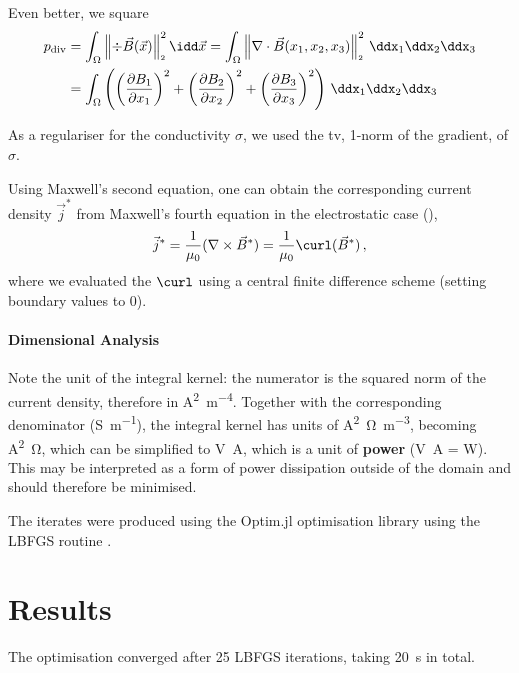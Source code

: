 \documentclass[10pt]{article}
\renewcommand{\norm}[1]{\left\lVert#1\right\rVert_{\scriptscriptstyle 2}}
\begin{document}
  Even better, we square
  \begin{align*}
    p_{\rm div} & = \int_\Omega \norm{\div \vec{B}(\vec{x})}^2 \idd\vec{x} = \int_{\Omega} \norm{\nabla \cdot \vec{B}(x_1, x_2, x_3)}^2 \,\ddx_1\ddx_2\ddx_3                                                             \\
                & = \int_\Omega \left(\left(\frac{\partial B_1}{\partial x_1}\right)^2 + \left(\frac{\partial B_2}{\partial x_2}\right)^2 + \left(\frac{\partial B_3}{\partial x_3}\right)^2\right) \,\ddx_1\ddx_2\ddx_3
  \end{align*}

  As a regulariser for the conductivity $\sigma$, we used the \gls{tv}, 1-norm of the gradient, of $\sigma$.

  Using Maxwell's second equation, one can obtain the corresponding current density $\vec{j}^*$ from Maxwell's fourth equation in the electrostatic case (),
  $$\vec{j}^* = \frac{1}{\mu_0} (\nabla \times \vec{B}^*) = \frac{1}{\mu_0} \curl(\vec{B}^*)\,,$$
  where we evaluated the $\curl$ using a central finite difference scheme (setting boundary values to 0).

  \paragraph{Dimensional Analysis}
  Note the unit of the integral kernel: the numerator is the squared norm of the current density, therefore in \unit{\ampere\squared\per\meter^4}. Together with the corresponding denominator (\unit{\siemens\per\meter}), the integral kernel has units of \unit{\ampere\squared\ohm\per\meter^3}, becoming \unit{\ampere\squared\ohm}, which can be simplified to \unit{\volt\ampere}, which is a unit of \textbf{power} (\unit{\volt\ampere} = \unit{W}).
  This may be interpreted as a form of power dissipation outside of the domain and should therefore be minimised.

  The iterates were produced using the Optim.jl optimisation library \parencite{2018-optim-jl} using the LBFGS routine \parencite{1989-lbfgs}.

  \section{Results}
  \label{sec:results}
  The optimisation converged after 25 LBFGS iterations, taking \SI{20}{\second} in total.
\end{document}
